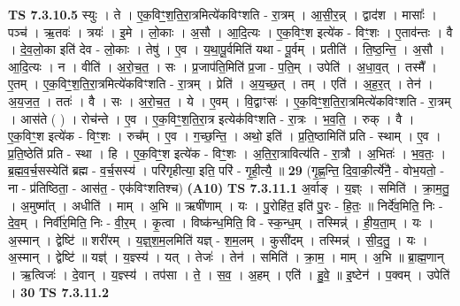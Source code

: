 \documentclass[17pt]{extarticle}
\begin{document}
                  \newline
                                \textbf{ TS 7.3.10.5} \newline
                  स्युः । ते । ए॒क॒विꣳ॒॒श॒ति॒रा॒त्रमित्ये॑कविꣳशति - रा॒त्रम् । आ॒सी॒र॒न्न् । द्वाद॑श । मासाः᳚ । पञ्च॑ । ऋ॒तवः॑ । त्रयः॑ । इ॒मे । लो॒काः । अ॒सौ । आ॒दि॒त्यः । ए॒क॒विꣳ॒॒श इत्ये॑क - विꣳ॒॒शः । ए॒ताव॑न्तः । वै । दे॒व॒लो॒का इति॑ देव - लो॒काः । तेषु॑ । ए॒व । य॒था॒पू॒र्वमिति॑ यथा - पू॒र्वम् । प्रतीति॑ । ति॒ष्ठ॒न्ति॒ । अ॒सौ । आ॒दि॒त्यः । न । वीति॑ । अ॒रो॒च॒त॒ । सः । प्र॒जाप॑ति॒मिति॑ प्र॒जा - प॒ति॒म् । उपेति॑ । अ॒धा॒व॒त् । तस्मै᳚ । ए॒तम् । ए॒क॒विꣳ॒॒श॒ति॒रा॒त्रमित्ये॑कविꣳशति - रा॒त्रम् । प्रेति॑ । अ॒य॒च्छ॒त् । तम् । एति॑ । अ॒ह॒र॒त् । तेन॑ । अ॒य॒ज॒त॒ । ततः॑ । वै । सः । अ॒रो॒च॒त॒ । ये । ए॒वम् । वि॒द्वाꣳसः॑ । ए॒क॒विꣳ॒॒श॒ति॒रा॒त्रमित्ये॑कविꣳशति - रा॒त्रम् । आस॑ते ( ) । रोच॑न्ते । ए॒व । ए॒क॒विꣳ॒॒श॒ति॒रा॒त्र इत्येक॑विꣳशति - रा॒त्रः । भ॒व॒ति॒ । रुक् । वै । ए॒क॒विꣳ॒॒श इत्ये॑क - विꣳ॒॒शः । रुच᳚म् । ए॒व । ग॒च्छ॒न्ति॒ । अथो॒ इति॑ । प्र॒ति॒ष्ठामिति॑ प्रति - स्थाम् । ए॒व । प्र॒ति॒ष्ठेति॑ प्रति - स्था । हि । ए॒क॒विꣳ॒॒श इत्ये॑क - विꣳ॒॒शः । अ॒ति॒रा॒त्रावित्य॑ति - रा॒त्रौ । अ॒भितः॑ । भ॒व॒तः॒ । ब्र॒ह्म॒व॒र्च॒सस्येति॑ ब्रह्म - व॒र्च॒सस्य॑ । परि॑गृहीत्या॒ इति॒ परि॑ - गृ॒ही॒त्यै॒ ॥ \textbf{  29} \newline
                  \newline
                      (गृ॒ह्ण॒न्ति॒ दि॒वा॒की॒र्त्ये॑नै॒ - वोभ॒यतो॒ - ना - प्र॑तिष्ठिता॒ - आस॑त॒ - एक॑विꣳशतिश्च)  \textbf{(A10)} \newline \newline
                                \textbf{ TS 7.3.11.1} \newline
                  अ॒र्वाङ् । य॒ज्ञ्ः । समिति॑ । क्रा॒म॒तु॒ । अ॒मुष्मा᳚त् । अधीति॑ । माम् । अ॒भि ॥ ऋषी॑णाम् । यः । पु॒रोहि॑त॒ इति॑ पु॒रः - हि॒तः॒ ॥ निर्दे॑व॒मिति॒ निः - दे॒व॒म् । निर्वी॑र॒मिति॒ निः - वी॒र॒म् । कृ॒त्वा । विष्क॑न्ध॒मिति॒ वि - स्क॒न्ध॒म् । तस्मिन्न्॑ । ही॒य॒ता॒म् । यः । अ॒स्मान् । द्वेष्टि॑ ॥ शरी॑रम् । य॒ज्ञ्॒श॒म॒लमिति॑ यज्ञ् - श॒म॒लम् । कुसी॑दम् । तस्मिन्न्॑ । सी॒द॒तु॒ । यः । अ॒स्मान् । द्वेष्टि॑ ॥ यज्ञ्॑ । य॒ज्ञ्स्य॑ । यत् । तेजः॑ । तेन॑ । समिति॑ । क्रा॒म॒ । माम् । अ॒भि ॥ ब्रा॒ह्म॒णान् । ऋ॒त्विजः॑ । दे॒वान् । य॒ज्ञ्स्य॑ । तप॑सा । ते॒ । स॒व॒ । अ॒हम् । एति॑ । हु॒वे॒ ॥ इ॒ष्टेन॑ । प॒क्वम् । उपेति॑ । \textbf{  30} \newline
                  \newline
                                \textbf{ TS 7.3.11.2} \newline
\end{document}
